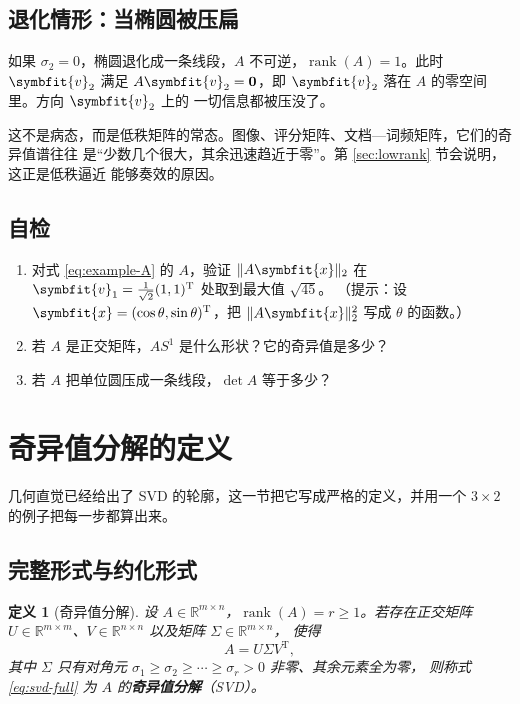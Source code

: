 \documentclass[UTF8, 11pt, a4paper, fontset=windows]{ctexart}
\theoremstyle{cnthm}
\theoremstyle{cndef}
\newtheorem{defn}{定义}[section]
\newcommand{\T}{^{\mathrm{T}}}
\newcommand{\R}{\mathbb{R}}
\newcommand{\nrm}[1]{\lVert #1 \rVert}
\DeclareMathOperator{\rank}{rank}
\newcommand{\x}{\symbfit{x}}
\newcommand{\vv}{\symbfit{v}}
\begin{document}
\subsection{退化情形：当椭圆被压扁}

如果 $\sigma_2=0$，椭圆退化成一条线段，$A$ 不可逆，$\rank(A)=1$。此时
$\vv_2$ 满足 $A\vv_2=\mathbf{0}$，即 $\vv_2$ 落在 $A$ 的零空间里。方向 $\vv_2$ 上的
一切信息都被压没了。

这不是病态，而是低秩矩阵的常态。图像、评分矩阵、文档—词频矩阵，它们的奇异值谱往往
是“少数几个很大，其余迅速趋近于零”。第 \ref{sec:lowrank} 节会说明，这正是低秩逼近
能够奏效的原因。

\subsection*{自检}
\begin{enumerate}
  \item 对式 \eqref{eq:example-A} 的 $A$，验证 $\nrm{A\x}_2$ 在
        $\vv_1=\frac{1}{\sqrt2}(1,1)\T$ 处取到最大值 $\sqrt{45}$。
        （提示：设 $\x=(\cos\theta,\sin\theta)\T$，把 $\nrm{A\x}_2^2$ 写成 $\theta$ 的函数。）
  \item 若 $A$ 是正交矩阵，$AS^1$ 是什么形状？它的奇异值是多少？
  \item 若 $A$ 把单位圆压成一条线段，$\det A$ 等于多少？
\end{enumerate}

\section{奇异值分解的定义}\label{sec:def}

几何直觉已经给出了 SVD 的轮廓，这一节把它写成严格的定义，并用一个
$3\times2$ 的例子把每一步都算出来。

\subsection{完整形式与约化形式}

\begin{defn}[奇异值分解]\label{def:svd}
设 $A\in\R^{m\times n}$，$\rank(A)=r\ge1$。若存在正交矩阵
$U\in\R^{m\times m}$、$V\in\R^{n\times n}$ 以及矩阵 $\Sigma\in\R^{m\times n}$，
使得
\begin{equation}\label{eq:svd-full}
  A=U\Sigma V\T ,
\end{equation}
其中 $\Sigma$ 只有对角元 $\sigma_1\ge\sigma_2\ge\cdots\ge\sigma_r>0$ 非零、其余元素全为零，
则称式 \eqref{eq:svd-full} 为 $A$ 的\textbf{奇异值分解}（SVD）。
\end{defn}
\end{document}
